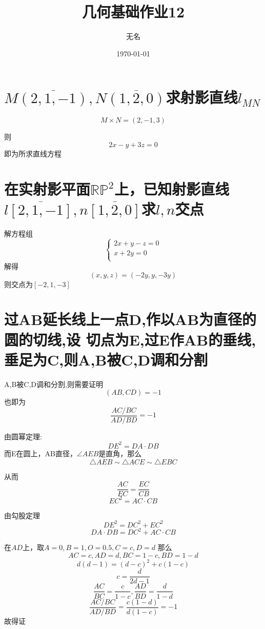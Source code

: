\documentclass[12pt]{ctexart}
\title{几何基础作业12}
\author{无名}
\date{\today}
\begin{document}
\maketitle

\section{$M\overline{(2,1,-1)},N\overline{(1,2,0)}$求射影直线$l_{MN}$}

\[M\times N=(2,-1,3)\]

则
\[2x-y+3z=0\]即为所求直线方程

\section{在实射影平面$\mathbb{RP}^2$上，已知射影直线$l\overline{[2,1,-1]},n\overline{[1,2,0]}$求$l,n$交点}
解方程组
\[\begin{cases}
    2x+y-z=0\\
    x+2y=0\\
\end{cases}\]
解得
\[(x,y,z)=(-2y,y,-3y)
\]
则交点为$[-2,1,-3]$
\section{过AB延长线上一点D,作以AB为直径的圆的切线,设
切点为E,过E作AB的垂线,垂足为C,则A,B被C,D调和分割}
A,B被C,D调和分割,则需要证明
\[(AB,CD)=-1\]
也即为
\[\frac{AC/BC}{AD/BD}=-1
\]

由圆幂定理:
\[DE^2=DA\cdot DB\]
而E在圆上，AB直径，$\angle AEB$是直角，那么
\[\bigtriangleup AEB\sim \bigtriangleup ACE \sim \bigtriangleup EBC \]

从而
\[\frac{AC}{EC}=\frac{EC}{CB}
\]
\[EC^2=AC\cdot CB\]

由勾股定理
\[DE^2=DC^2+EC^2\]
\[DA\cdot DB= DC^2+ AC\cdot CB\]

在$AD$上，取$A=0,B=1,O=0.5,C=c,D=d$
那么
\[AC=c,AD=d,BC=1-c,BD=1-d\]
\[d(d-1)=(d-c)^2+c(1-c)\]
\[c=\frac{d}{2d-1}\]
\[\frac{AC}{BC}=\frac{c}{1-c},\frac{AD}{BD}=\frac{d}{1-d}\]
\[\frac{AC/BC}{AD/BD}=\frac{c(1-d)}{d(1-c)}=-1\]
故得证
\end{document}
